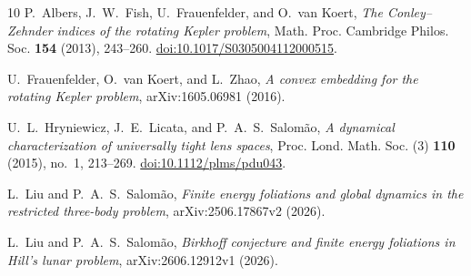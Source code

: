 \documentclass[11pt,reqno]{amsart}
\theoremstyle{plain}
\theoremstyle{definition}
\begin{document}
\begin{thebibliography}{10}
P.~Albers, J.~W.~Fish, U.~Frauenfelder, and O.~van Koert,
\emph{The Conley--Zehnder indices of the rotating Kepler problem},
Math. Proc. Cambridge Philos. Soc. \textbf{154} (2013), 243--260.
\href{https://doi.org/10.1017/S0305004112000515}{doi:10.1017/S0305004112000515}.

U.~Frauenfelder, O.~van Koert, and L.~Zhao,
\emph{A convex embedding for the rotating Kepler problem},
arXiv:1605.06981 (2016).

U.~L.~Hryniewicz, J.~E.~Licata, and P.~A.~S.~Salom\~ao,
\emph{A dynamical characterization of universally tight lens spaces},
Proc. Lond. Math. Soc. (3) \textbf{110} (2015), no.~1, 213--269.
\href{https://doi.org/10.1112/plms/pdu043}{doi:10.1112/plms/pdu043}.

L.~Liu and P.~A.~S.~Salom\~ao,
\emph{Finite energy foliations and global dynamics in the restricted three-body problem},
arXiv:2506.17867v2 (2026).

L.~Liu and P.~A.~S.~Salom\~ao,
\emph{Birkhoff conjecture and finite energy foliations in Hill's lunar problem},
arXiv:2606.12912v1 (2026).

\end{thebibliography}
\end{document}
